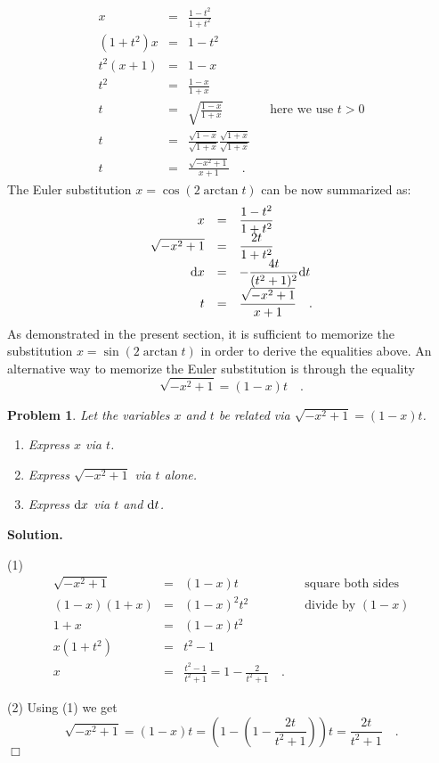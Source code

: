 \documentclass[12pt]{book}
\newenvironment{solution}{\medskip\noindent\textbf{Solution.} }{$\Box$}
\newtheorem{problem}[theorem]{Problem}
\begin{document}
\[
\begin{array}{rcll|l}
\displaystyle x&=&\displaystyle \frac{1-t^2}{1+t^2}\\
\displaystyle (1+t^2)x&=&\displaystyle 1-t^2\\
\displaystyle t^2(x+1)&=&\displaystyle 1-x\\
\displaystyle t^2&=&\displaystyle \frac{1-x}{1+x}\\
\displaystyle t&=&\displaystyle \sqrt{\frac{1-x}{1+x}}&& \text{here we use } t>0\\
\displaystyle t&=&\displaystyle \frac{\sqrt{1-x}}{\sqrt{ 1+x}} \frac{ \sqrt{1+x}}{\sqrt{1+x}} \\
\displaystyle t&=&\displaystyle \frac{\sqrt{-x^2+1}}{x+1}\quad .
\end{array}
\]
The Euler substitution $x= \cos (2\arctan t)$ can be now summarized as:
\[
\begin{array}{rcl}
x&=&\displaystyle \frac{1-t^2}{1+t^2}\\
\sqrt{-x^2+1}&=&\displaystyle \frac{2t}{1+t^2}  \\
{\normalfont \text{d}} x&=&\displaystyle  -\frac{4 t}{(t^{2}+1)^{2}} {\normalfont \text{d}} t\\
t&=&\displaystyle \frac{\sqrt{-x^2+1}}{x+1} \quad .
\end{array}
\]
As demonstrated in the present section, it is sufficient to memorize the substitution $x=\sin (2\arctan t)$ in order to derive the equalities above. An alternative way to memorize the Euler substitution is through the equality
\[
\sqrt{-x^2+1}=(1-x)t\quad .
\]
\begin{problem}
Let the variables $x$ and $t$ be related via $\sqrt{-x^2+1}= ( 1-x)t$.
\begin{enumerate}
\item Express $x$ via $t$.
\item Express $\sqrt{-x^2+1}$ via $t$ alone.
\item Express ${\normalfont \text{d}} x$ via $t$ and ${\normalfont \text{d}} t$.
\end{enumerate}
\end{problem}
\begin{solution}

\noindent (1)
\[
\begin{array}{rcll|l}
\sqrt{-x^2+1}&=&(1-x)t&&\text{square both sides}\\
(1-x)(1+x)&=&(1-x)^2t^2&&\text{divide by } (1-x)\\
1+x&=&(1-x)t^2\\
x(1+t^2)&=&t^2-1\\
x&=&\displaystyle \frac{t^2-1}{t^2+1}= 1-\frac{2}{t^2+1}\quad .
\end{array}
\]

\noindent (2) Using (1) we get
\[
\sqrt{-x^2+1}=(1-x)t=\left(1-\left(1-\frac{2t}{t^2+1}\right)\right)t= \frac{ 2t}{ t^2+1}\quad .
\]
\end{solution}
\end{document}
